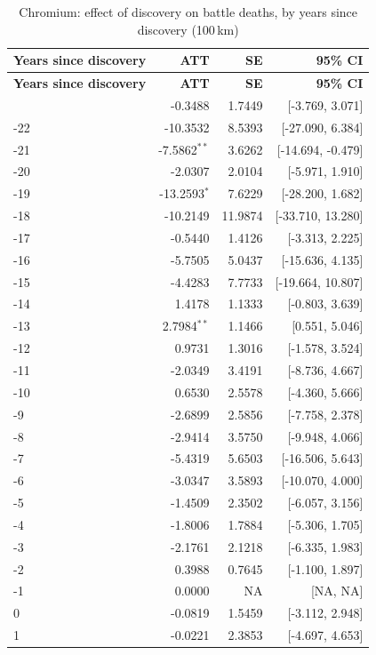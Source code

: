 \begin{longtable}{lrrr}
\caption{Chromium: effect of discovery on battle deaths, by years since discovery (100\,km)} \label{tab:chromium_battle_deaths_best_} \\
\toprule
\textbf{Years since discovery} & \textbf{ATT} & \textbf{SE} & \textbf{95\% CI} \\
\midrule \endfirsthead
\toprule
\textbf{Years since discovery} & \textbf{ATT} & \textbf{SE} & \textbf{95\% CI} \\
\midrule \endhead
\bottomrule \endlastfoot
-23 & -0.3488 & 1.7449 & [-3.769, 3.071] \\
-22 & -10.3532 & 8.5393 & [-27.090, 6.384] \\
-21 & -7.5862$^{**}$ & 3.6262 & [-14.694, -0.479] \\
-20 & -2.0307 & 2.0104 & [-5.971, 1.910] \\
-19 & -13.2593$^{*}$ & 7.6229 & [-28.200, 1.682] \\
-18 & -10.2149 & 11.9874 & [-33.710, 13.280] \\
-17 & -0.5440 & 1.4126 & [-3.313, 2.225] \\
-16 & -5.7505 & 5.0437 & [-15.636, 4.135] \\
-15 & -4.4283 & 7.7733 & [-19.664, 10.807] \\
-14 & 1.4178 & 1.1333 & [-0.803, 3.639] \\
-13 & 2.7984$^{**}$ & 1.1466 & [0.551, 5.046] \\
-12 & 0.9731 & 1.3016 & [-1.578, 3.524] \\
-11 & -2.0349 & 3.4191 & [-8.736, 4.667] \\
-10 & 0.6530 & 2.5578 & [-4.360, 5.666] \\
-9 & -2.6899 & 2.5856 & [-7.758, 2.378] \\
-8 & -2.9414 & 3.5750 & [-9.948, 4.066] \\
-7 & -5.4319 & 5.6503 & [-16.506, 5.643] \\
-6 & -3.0347 & 3.5893 & [-10.070, 4.000] \\
-5 & -1.4509 & 2.3502 & [-6.057, 3.156] \\
-4 & -1.8006 & 1.7884 & [-5.306, 1.705] \\
-3 & -2.1761 & 2.1218 & [-6.335, 1.983] \\
-2 & 0.3988 & 0.7645 & [-1.100, 1.897] \\
-1 & 0.0000 & NA & [NA, NA] \\
0 & -0.0819 & 1.5459 & [-3.112, 2.948] \\
1 & -0.0221 & 2.3853 & [-4.697, 4.653] \\

\end{longtable}
